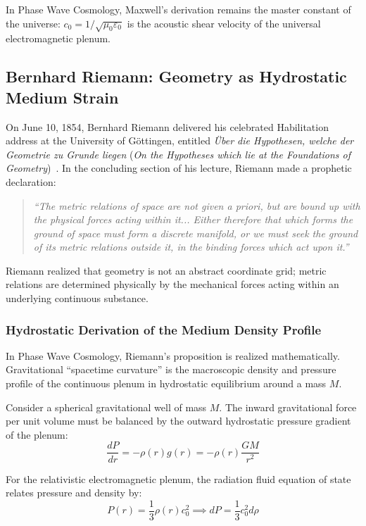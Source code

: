 \documentclass[11pt,a4paper]{article}
\begin{document}
In Phase Wave Cosmology, Maxwell's derivation remains the master constant of the universe: $c_0 = 1/\sqrt{\mu_0\varepsilon_0}$ is the acoustic shear velocity of the universal electromagnetic plenum.

\subsection{Bernhard Riemann: Geometry as Hydrostatic Medium Strain}
\label{subsec:riemann_geometry}

On June 10, 1854, Bernhard Riemann delivered his celebrated Habilitation address at the University of Göttingen, entitled \textit{Über die Hypothesen, welche der Geometrie zu Grunde liegen} (\textit{On the Hypotheses which lie at the Foundations of Geometry})~\cite{Riemann1854}. In the concluding section of his lecture, Riemann made a prophetic declaration:
\begin{quote}
\textit{``The metric relations of space are not given a priori, but are bound up with the physical forces acting within it... Either therefore that which forms the ground of space must form a discrete manifold, or we must seek the ground of its metric relations outside it, in the binding forces which act upon it.''}
\end{quote}

Riemann realized that geometry is not an abstract coordinate grid; metric relations are determined physically by the mechanical forces acting within an underlying continuous substance.

\subsubsection{Hydrostatic Derivation of the Medium Density Profile}

In Phase Wave Cosmology, Riemann's proposition is realized mathematically. Gravitational ``spacetime curvature'' is the macroscopic density and pressure profile of the continuous plenum in hydrostatic equilibrium around a mass $M$.

Consider a spherical gravitational well of mass $M$. The inward gravitational force per unit volume must be balanced by the outward hydrostatic pressure gradient of the plenum:
\begin{equation}
\frac{dP}{dr} = -\rho(r) g(r) = -\rho(r) \frac{GM}{r^2}
\label{eq:hydrostatic_plenum}
\end{equation}

For the relativistic electromagnetic plenum, the radiation fluid equation of state relates pressure and density by:
\begin{equation}
P(r) = \frac{1}{3} \rho(r) c_0^2 \implies dP = \frac{1}{3} c_0^2 d\rho
\end{equation}
\end{document}
